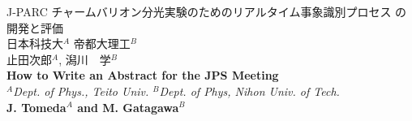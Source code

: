 \documentclass[12pt,a4paper,upLaTeX]{jsarticle}
\begin{document}
\vspace{-5pt}
\begin{center}
{\gt \Large J-PARC チャームバリオン分光実験のためのリアルタイム事象識別プロセス の開発と評価 }\\[14pt]

{\gt \large 日本科技大$^A$ 帝都大理工$^B$ \\ 止田次郎$^A$, 潟川　学$^B$}\\[5pt]

{\large \bf How to Write an Abstract for the JPS Meeting}\\[5pt]

{\large \it $^A$Dept. of Phys., Teito Univ. $^B$Dept. of Phys, Nihon Univ. of Tech.}\\

{\large \bf J. Tomeda$^A$ and M. Gatagawa$^B$}
\end{center}

\vspace{10pt}
\end{document}
